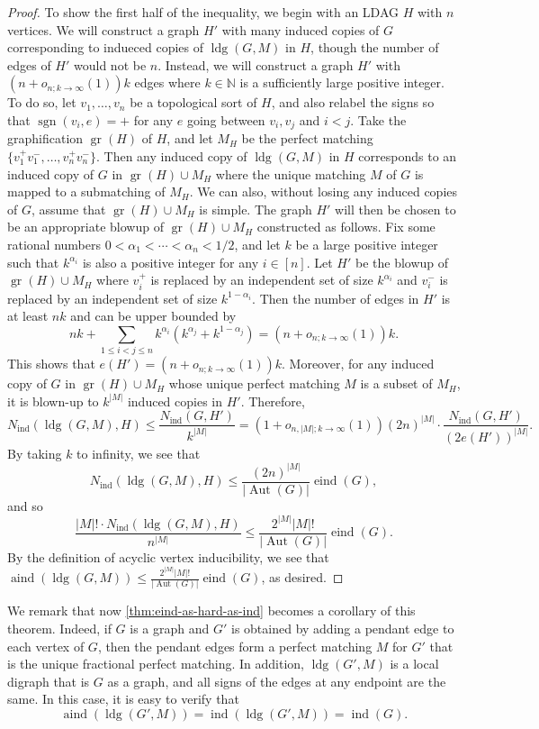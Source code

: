 \documentclass[reqno,11pt]{amsart}
\numberwithin{equation}{section}
\theoremstyle{definition}
\theoremstyle{remark}
\newcommand{\abs}[1]{\left\lvert#1\right\rvert}
\DeclareMathOperator{\sgn}{sgn}
\DeclareMathOperator{\gr}{gr}
\DeclareMathOperator{\ind}{ind}
\DeclareMathOperator{\eind}{eind}
\DeclareMathOperator{\aind}{aind}
\DeclareMathOperator{\ldg}{ldg}
\DeclareMathOperator{\Aut}{Aut}
\newcommand{\NN}{\mathbb{N}}
\begin{document}
\begin{proof}
    To show the first half of the inequality, we begin with an LDAG $H$ with $n$ vertices.
    We will construct a graph $H'$ with many induced copies of $G$ corresponding to indueced copies of $\ldg(G,M)$ in $H$, though the number of edges of $H'$ would not be $n$.
    Instead, we will construct a graph $H'$ with $(n+o_{n;k\to\infty}(1))k$ edges where $k\in\NN$ is a sufficiently large positive integer.
    To do so, let $v_1,\ldots, v_n$ be a topological sort of $H$, and also relabel the signs so that $\sgn(v_i,e)=+$ for any $e$ going between $v_i,v_j$ and $i<j$.
    Take the graphification $\gr(H)$ of $H$, and let $M_H$ be the perfect matching $\{v_1^+v_1^-,\ldots, v_n^+v_n^-\}$.
    Then any induced copy of $\ldg(G,M)$ in $H$ corresponds to an induced copy of $G$ in $\gr(H)\cup M_H$ where the unique matching $M$ of $G$ is mapped to a submatching of $M_H$.
    We can also, without losing any induced copies of $G$, assume that $\gr(H)\cup M_H$ is simple.
    The graph $H'$ will then be chosen to be an appropriate blowup of $\gr(H)\cup M_H$ constructed as follows.
    Fix some rational numbers $0<\alpha_1<\cdots <\alpha_n<1/2$, and let $k$ be a large positive integer such that $k^{\alpha_i}$ is also a positive integer for any $i\in[n]$.
    Let $H'$ be the blowup of $\gr(H)\cup M_H$ where $v_i^+$ is replaced by an independent set of size $k^{\alpha_i}$ and $v_i^-$ is replaced by an independent set of size $k^{1-\alpha_i}$.
    Then the number of edges in $H'$ is at least $nk$ and can be upper bounded by
    \[nk+\sum_{1\leq i<j\leq n}k^{\alpha_i}\left(k^{\alpha_j}+k^{1-\alpha_j}\right) = (n+o_{n;k\to\infty}(1))k.\]
    This shows that $e(H') = (n+o_{n;k\to\infty}(1))k$.
    Moreover, for any induced copy of $G$ in $\gr(H)\cup M_H$ whose unique perfect matching $M$ is a subset of $M_H$, it is blown-up to $k^{\abs{M}}$ induced copies in $H'$.
    Therefore,
    \[ N_{\ind}(\ldg(G,M),H)\leq  \frac{N_{\ind}(G,H')}{k^{\abs{M}}}
        =(1+o_{n,\abs{M};k\to\infty}(1))(2n)^{\abs{M}}\cdot \frac{N_{\ind}(G,H')}{(2e(H'))^{\abs{M}}}.\]
    By taking $k$ to infinity, we see that
    \[N_{\ind}(\ldg(G,M),H)\leq \frac{(2n)^{\abs{M}}}{\abs{\Aut(G)}}\eind(G),\]
    and so
     \[\frac{\abs{M}!\cdot N_{\ind}(\ldg(G,M),H)}{n^{\abs{M}}}\leq \frac{2^{\abs{M}}\abs{M}!}{\abs{\Aut(G)}}\eind(G).\]
    By the definition of acyclic vertex inducibility, we see that $\aind(\ldg(G,M))\leq \frac{2^{\abs{M}}\abs{M}!}{\abs{\Aut(G)}}\eind(G)$, as desired.
\end{proof}

We remark that now \cref{thm:eind-as-hard-as-ind} becomes a corollary of this theorem.
Indeed, if $G$ is a graph and $G'$ is obtained by adding a pendant edge to each vertex of $G$, then the pendant edges form a perfect matching $M$ for $G'$ that is the unique fractional perfect matching.
In addition, $\ldg(G',M)$ is a local digraph that is $G$ as a graph, and all signs of the edges at any endpoint are the same.
In this case, it is easy to verify that
\[\aind(\ldg(G',M))=\ind(\ldg(G',M)) = \ind(G).\]
\end{document}
